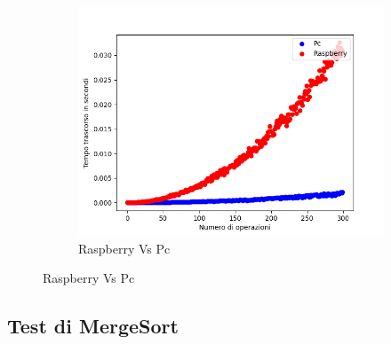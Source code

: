 \documentclass{article}
\begin{document}
\begin{figure}[h!]
\begin{subfigure}{0.6\textwidth}
					\includegraphics[width = \textwidth]{./Plots/PcVsRaspberry_InsertionSort.png}
					\caption{Raspberry Vs Pc}
				\end{subfigure}
				
			\end{figure}
	
		\clearpage
		\subsection{Test di MergeSort}
\end{document}
